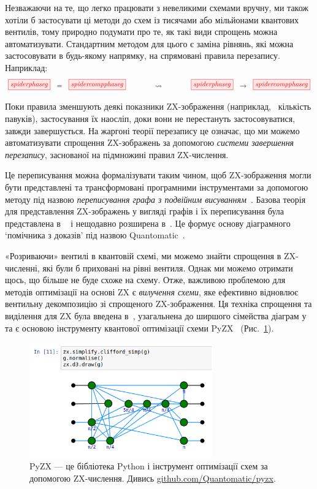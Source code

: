 \documentclass[11pt]{article}
\theoremstyle{definition}
\def\bR{\begin{color}{red}}
\def\bC{\begin{color}{cyan}}
\def\e{\end{color}\xspace}
\newcommand{\beq}{\begin{equation}}
\newcommand{\eeq}{\end{equation}\par\noindent}
\newcommand{\TODOb}[1]{\marginpar{\scriptsize\bR \textbf{TODO:} #1\e}}
\newcommand{\COMMh}[1]{\marginpar{\scriptsize\bC \textbf{COMM:} #1\e}}
\begin{document}
{Незважаючи на те, що легко працювати з невеликими схемами вручну, ми також хотіли б застосувати ці методи до схем із тисячами або мільйонами квантових вентилів, тому природно подумати про те, як такі види спрощень можна автоматизувати. Стандартним методом для цього є заміна рівнянь, які можна застосовувати в будь-якому напрямку, на спрямовані правила перезапису. Наприклад:
\beq\label{eq:rewrite-rule}
\tikzfig{spiderphaseg}\ \ =\ \ \tikzfig{spidercompphaseg}  
\qquad\qquad\leadsto\qquad\qquad
\tikzfig{spiderphaseg}\ \ \rightarrow\ \ \tikzfig{spidercompphaseg}   
\eeq
Поки правила зменшують деякі показники ZX-зображення (наприклад, ~кількість павуків), застосування їх наосліп, доки вони не перестануть застосовуватися, завжди завершується. На жаргоні теорії перезапису це означає, що ми можемо автоматизувати спрощення ZX-зображень за допомогою \textit{системи завершення перезапису}, заснованої на підмножині правил ZX-числення.

Це переписування можна формалізувати таким чином, щоб ZX-зображення могли бути представлені та трансформовані програмними інструментами за допомогою методу під назвою \textit{переписування графа з подвійним висуванням}~\cite{dpo-old}. Базова теорія для представлення ZX-зображень у вигляді графів і їх переписування була представлена в ~\cite{DK} і нещодавно розширена в~\cite{bonchi2020string}. Це формує основу діаграмного `помічника з доказів' під назвою Quantomatic~\cite{quanto-cade}.



«Розриваючи» вентилі в квантовій схемі, ми можемо знайти спрощення в ZX-численні, які були б приховані на рівні вентиля. Однак ми можемо отримати щось, що більше не буде схоже на схему. Отже, важливою проблемою для методів оптимізації на основі ZX є \textit{вилучення схеми}, яке ефективно відновлює вентильну декомпозицію зі спрощеного ZX-зображення. Ця техніка спрощення та виділення для ZX була введена в~\cite{clifford-simp}, узагальнена до ширшого сімейства діаграм у~\cite{backens2020there} та є основою інструменту квантової оптимізації схеми PyZX~\cite {pyzx} (Рис.~\ref{fig:pyzx}).

\begin{figure}[]
  \centering
  \includegraphics[width=0.7\textwidth]{pyzx2.png}
  \caption{PyZX — це бібліотека Python і інструмент оптимізації схем за допомогою ZX-числення. Дивись \url{github.com/Quantomatic/pyzx}.}
  \label{fig:pyzx}
\end{figure}


}
\end{document}
